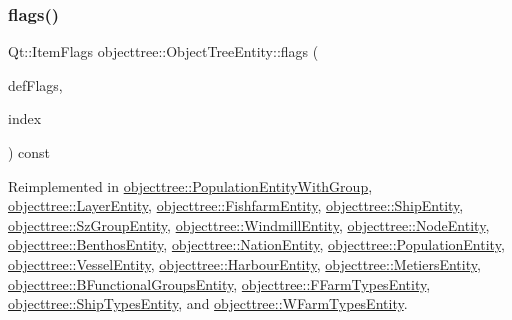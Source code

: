 \subsubsection{\texorpdfstring{flags()}{flags()}}
{\footnotesize\ttfamily Qt\+::\+Item\+Flags objecttree\+::\+Object\+Tree\+Entity\+::flags (\begin{DoxyParamCaption}\item[{Qt\+::\+Item\+Flags}]{def\+Flags,  }\item[{const Q\+Model\+Index \&}]{index }\end{DoxyParamCaption}) const\hspace{0.3cm}{\ttfamily [virtual]}}



Reimplemented in \mbox{\hyperlink{classobjecttree_1_1_population_entity_with_group_ae9b985951942efd8df58717d89cb9a35}{objecttree\+::\+Population\+Entity\+With\+Group}}, \mbox{\hyperlink{classobjecttree_1_1_layer_entity_afe44a5207b2838788a2ccb34ffe5f527}{objecttree\+::\+Layer\+Entity}}, \mbox{\hyperlink{classobjecttree_1_1_fishfarm_entity_ac474b5816c70facd1ea6da26b0678b91}{objecttree\+::\+Fishfarm\+Entity}}, \mbox{\hyperlink{classobjecttree_1_1_ship_entity_abc1800df4441a71edbb129f2c8326ecb}{objecttree\+::\+Ship\+Entity}}, \mbox{\hyperlink{classobjecttree_1_1_sz_group_entity_a054fe370e7cb70ac63fe10d6a1d936be}{objecttree\+::\+Sz\+Group\+Entity}}, \mbox{\hyperlink{classobjecttree_1_1_windmill_entity_a867c267caf8df2bbf9fd40903a5250d0}{objecttree\+::\+Windmill\+Entity}}, \mbox{\hyperlink{classobjecttree_1_1_node_entity_ac710602e9c61c23ebf718c815044eff7}{objecttree\+::\+Node\+Entity}}, \mbox{\hyperlink{classobjecttree_1_1_benthos_entity_a57ec678c2e68372b9d678e6f6b5546eb}{objecttree\+::\+Benthos\+Entity}}, \mbox{\hyperlink{classobjecttree_1_1_nation_entity_acddd457619500a3bfbb983ece060e487}{objecttree\+::\+Nation\+Entity}}, \mbox{\hyperlink{classobjecttree_1_1_population_entity_a9da7b5ae9e92f9690921af7796cbb799}{objecttree\+::\+Population\+Entity}}, \mbox{\hyperlink{classobjecttree_1_1_vessel_entity_a9998a9efc49fd3e195bf8cd9c5936118}{objecttree\+::\+Vessel\+Entity}}, \mbox{\hyperlink{classobjecttree_1_1_harbour_entity_af7bd7bc6f18e5fe8f8fac7cdce4fbe21}{objecttree\+::\+Harbour\+Entity}}, \mbox{\hyperlink{classobjecttree_1_1_metiers_entity_aedf45a5092b676dee0b987a5ec6384d4}{objecttree\+::\+Metiers\+Entity}}, \mbox{\hyperlink{classobjecttree_1_1_b_functional_groups_entity_aed532d8d49b107b7af8a57385963e94c}{objecttree\+::\+B\+Functional\+Groups\+Entity}}, \mbox{\hyperlink{classobjecttree_1_1_f_farm_types_entity_a90cf36929e178b9853e30e88fd9af9cb}{objecttree\+::\+F\+Farm\+Types\+Entity}}, \mbox{\hyperlink{classobjecttree_1_1_ship_types_entity_a382120055737f7e652bbd5584b9e034c}{objecttree\+::\+Ship\+Types\+Entity}}, and \mbox{\hyperlink{classobjecttree_1_1_w_farm_types_entity_aa9328fe3b82e5c58eb36283051e06bff}{objecttree\+::\+W\+Farm\+Types\+Entity}}.

